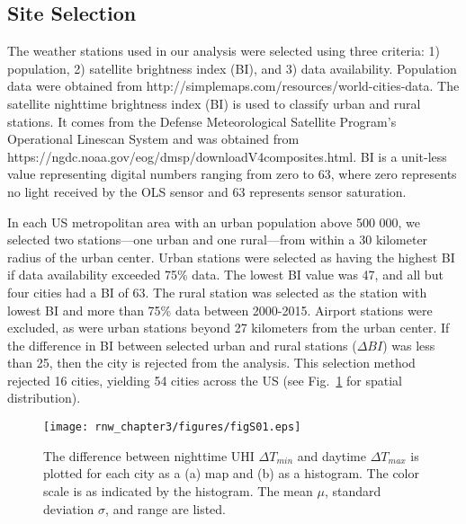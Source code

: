 \subsection{Site Selection}
The weather stations used in our analysis were selected using three criteria: 1) population, 2) satellite brightness index (BI), and 3) data availability.
Population data were obtained from http://simplemaps.com/resources/world-cities-data. The satellite nighttime brightness index (BI) is used to classify urban and rural stations. It comes  from the  Defense Meteorological Satellite Program's Operational Linescan System \cite{dmspols}
and was obtained from https://ngdc.noaa.gov/eog/dmsp/downloadV4composites.html. BI is a unit-less value representing digital numbers ranging from zero to 63, where zero represents no light received by the OLS sensor and 63 represents sensor saturation.

In each US metropolitan area with an urban population above 500 000, we selected two stations---one urban and one rural---from within a 30 kilometer radius of the urban center. Urban stations were selected as having the highest BI if data availability exceeded 75\% data. The lowest BI value was 47, and all but four cities had a BI of 63.  %
The rural station was selected as the station with lowest BI and more than 75\% data between 2000-2015. %
Airport stations were excluded, as were urban stations beyond
27 kilometers from the urban center.  If the difference in BI between selected urban and rural stations ($\Delta BI$) was less than 25, then the city is rejected from the analysis.  This selection method  rejected 16 cities, yielding 54 cities across the US (see Fig.~\ref{fig:s01} for spatial distribution). 

\begin{figure}
\texttt{[image: rnw\_chapter3/figures/figS01.eps]}
\caption{The difference between nighttime UHI $\Delta T_{min} $ and daytime $\Delta T_{max}$ is plotted for each city as a (a) map and (b) as a histogram. The color scale is as indicated by the histogram. The mean $\mu$, standard deviation $\sigma$, and range are listed. }
\label{fig:s01}
\end{figure}

